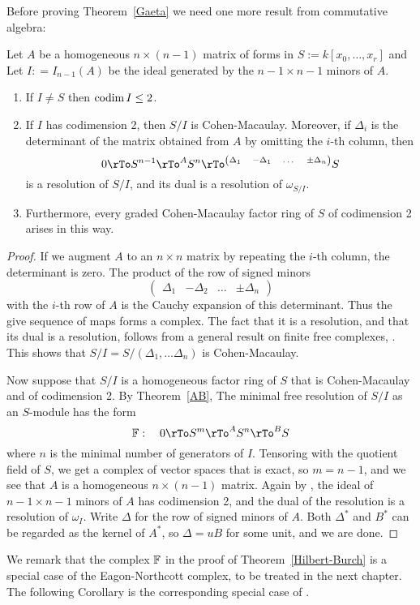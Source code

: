 Before proving Theorem~\ref{Gaeta} we need one more result from commutative algebra:

\begin{theorem}\label{Hilbert-Burch}
Let $A$ be a homogeneous $n\times (n-1)$ matrix of forms in $S := k[x_{0},\dots, x_{r}]$ and
Let  $I: = I_{n-1}(A)$ be the ideal generated by the $n-1\times n-1$ minors of $A$.
\begin{enumerate}
 
\item If $I \neq S$ then $\operatorname{codim} I \leq 2$.
 \item If $I$ has codimension 2, then
$S/I$ is Cohen-Macaulay. Moreover, if $\Delta_{i}$ is the determinant of the matrix obtained
from $A$ by omitting the $i$-th column, then 
$$
0\rTo S^{n-1} \rTo^{A} S^{n}\rTo^{\scriptsize
\begin{pmatrix}
 \Delta_{1}& -\Delta_{1}&\dots&\pm \Delta_{n}
\end{pmatrix}}
S
$$
is a resolution of $S/I$, and its dual is a resolution of $\omega_{S/I}$.
\item Furthermore, every graded Cohen-Macaulay factor ring of $S$ of codimension 2
arises in this way.
\end{enumerate}
\end{theorem}

\begin{proof}
If we augment $A$ to an $n\times n$ matrix by repeating the $i$-th column, the determinant is zero.
The product of the row of signed minors 
$$\begin{pmatrix}
 \Delta_{1}& -\Delta_{2}&\dots&\pm \Delta_{n}
\end{pmatrix}
$$ 
with the $i$-th row of $A$ is the Cauchy expansion of this determinant. Thus the give sequence of maps
forms a complex. The fact that it is a resolution, and that its dual is a resolution, follows from a general result on finite free complexes,
\cite[Theorem *****]{E}. This shows that $S/I = S/(\Delta_{1}, \dots \Delta_{n})$ is Cohen-Macaulay.

Now suppose that $S/I$ is a homogeneous factor ring of $S$ that is Cohen-Macaulay and of codimension 2.
By Theorem~\ref{AB}, The minimal free resolution of $S/I$ as an $S$-module has the form 
$$
\FF: \quad 0\rTo S^{m} \rTo^{A} S^{n} \rTo^{B} S
$$
where $n$ is the minimal number of generators of $I$. Tensoring with the quotient field of $S$, we
get a complex of vector spaces that is exact, so $m = n-1$, and we see that $A$ is a homogeneous
$n\times (n-1)$ matrix. Again by \cite[Theorem *****]{E}, the ideal of $n-1\times n-1$ minors of $A$ has
codimension 2, and the dual of the resolution is a resolution of $\omega_{I}$. Write $\Delta$ for the
row of signed minors of $A$. Both $\Delta^*$ and $B^*$ can be regarded as the kernel of $A^*$,
so $\Delta = uB$ for some unit, and we are done.
\end{proof}
We remark that the complex ${\mathbb F}$ in the proof of Theorem~\ref{Hilbert-Burch} is a special case of the Eagon-Northcott complex,
to be treated in the next chapter. The following Corollary is the corresponding special case of \cite[Theorem ***]{BE-annihilator}.

